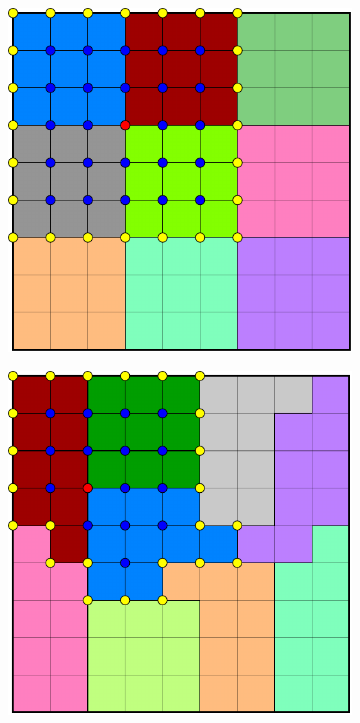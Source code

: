 \begin{figure}[htbp]
  \begin{subfigure}[t]{0.3\textwidth}
    \centerline{\includegraphics[width=0.9\linewidth]{figs/square/square_cart_struct_node_supp}}
  \end{subfigure}
  \hfill
  \begin{subfigure}[t]{0.3\textwidth}
    \centerline{\includegraphics[width=0.9\linewidth]{figs/square/square_cart_metis_node_supp}}

\end{subfigure}
\end{figure}
